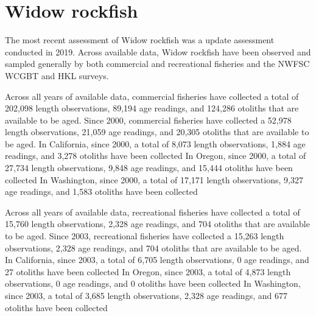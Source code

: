 \documentclass[11pt,
  english,
  letterpaper,
]{article}
\begin{document}

\hypertarget{widow-rockfish}{%
\section{Widow rockfish}\label{widow-rockfish}}

\leavevmode\tagmcend\tagstructend


The most recent assessment of Widow rockfish was a update assessment conducted in 2019. Across available data, Widow rockfish have been observed and sampled generally by both commercial and recreational fisheries and the NWFSC WCGBT and HKL surveys.

\leavevmode\tagmcend\tagstructend\par


Across all years of available data, commercial fisheries have collected a total of 202,098 length observations, 89,194 age readings, and 124,286 otoliths that are available to be aged. Since 2000, commercial fisheries have collected a 52,978 length observations, 21,059 age readings, and 20,305 otoliths that are available to be aged. In California, since 2000, a total of 8,073 length observations, 1,884 age readings, and 3,278 otoliths have been collected In Oregon, since 2000, a total of 27,734 length observations, 9,848 age readings, and 15,444 otoliths have been collected In Washington, since 2000, a total of 17,171 length observations, 9,327 age readings, and 1,583 otoliths have been collected

\leavevmode\tagmcend\tagstructend\par


Across all years of available data, recreational fisheries have collected a total of 15,760 length observations, 2,328 age readings, and 704 otoliths that are available to be aged. Since 2003, recreational fisheries have collected a 15,263 length observations, 2,328 age readings, and 704 otoliths that are available to be aged. In California, since 2003, a total of 6,705 length observations, 0 age readings, and 27 otoliths have been collected In Oregon, since 2003, a total of 4,873 length observations, 0 age readings, and 0 otoliths have been collected In Washington, since 2003, a total of 3,685 length observations, 2,328 age readings, and 677 otoliths have been collected
\end{document}
